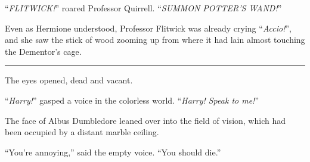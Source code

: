 ``\emph{FLITWICK!}'' roared Professor Quirrell. ``\emph{SUMMON POTTER'S WAND!}''

Even as Hermione understood, Professor Flitwick was already crying ``\emph{Accio!}'', and she saw the stick of wood zooming up from where it had lain almost touching the Dementor's cage.

\begin{center}\rule{3in}{0.4pt}\end{center}

The eyes opened, dead and vacant.

``\emph{Harry!}'' gasped a voice in the colorless world. ``\emph{Harry! Speak to me!}''

The face of Albus Dumbledore leaned over into the field of vision, which had been occupied by a distant marble ceiling.

``You're annoying,'' said the empty voice. ``You should die.''

